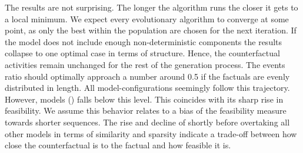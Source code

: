 \documentclass[./../../paper.tex]{subfiles}
\begin{document}
The results are not surprising. The longer the algorithm runs the closer it gets to a local minimum. 
We expect every evolutionary algorithm to converge at some point, as only the best within the population are chosen for the next iteration. If the model does not include enough non-deterministic components the results collapse to one optimal case in terms of structure. Hence, the counterfactual activities remain unchanged for the rest of the generation process. 
The events ratio should optimally approach a number around 0.5 if the factuals are evenly distributed in length. All model-configurations seemingly follow this trajectory. 
However, models () falls below this level. This coincides with its sharp rise in feasibility. We assume this behavior relates to a bias of the feasibility measure towards shorter sequences.
The rise and decline of  shortly before overtaking all other models in terms of similarity and sparsity indicate a trade-off between how close the counterfactual is to the factual and how feasible it is.     



\end{document}
